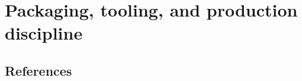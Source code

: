 \documentclass[11pt,oneside]{book}
\begin{document}
\part{Packaging, tooling, and production discipline}






\backmatter






\cleardoublepage
\chapter{References}
\end{document}
